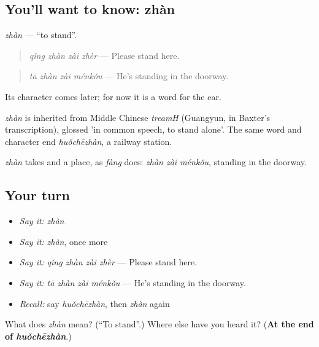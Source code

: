 \subsection*{You'll want to know: zhàn}
\emph{zhàn} — \textquotedblleft{}to stand\textquotedblright{}.

\begin{quote}
\emph{qǐng zhàn zài zhèr} — Please stand here.
\end{quote}

\begin{quote}
\emph{tā zhàn zài ménkǒu} — He's standing in the doorway.
\end{quote}

Its character comes later; for now it is a word for the ear.

\begin{cousinweb}
\emph{zhàn} is inherited from Middle Chinese \emph{treamH} (Guangyun, in Baxter's transcription), glossed 'in common speech, to stand alone'. The same word and character end \emph{huǒchēzhàn}, a railway station.
\end{cousinweb}

\begin{grammarlens}[title={What you've built}]
\emph{zhàn} takes  and a place, as \emph{fàng} does: \emph{zhàn zài ménkǒu}, standing in the doorway.
\end{grammarlens}

\subsection*{Your turn}
\begin{itemize}
\raggedright
  \item \emph{Say it:} \emph{zhàn}
  \item \emph{Say it:} \emph{zhàn}, once more
  \item \emph{Say it:} \emph{qǐng zhàn zài zhèr} — Please stand here.
  \item \emph{Say it:} \emph{tā zhàn zài ménkǒu} — He's standing in the doorway.
  \item \emph{Recall:} say \emph{huǒchēzhàn}, then \emph{zhàn} again
\end{itemize}

\begin{tcolorbox}[breakable,colback=teal!4,colframe=teal!35!black,title={Before you move on}]
What does \emph{zhàn} mean? (\textquotedblleft{}To stand\textquotedblright{}.) Where else have you heard it? (\textbf{At the end of \emph{huǒchēzhàn}}.)
\end{tcolorbox}
